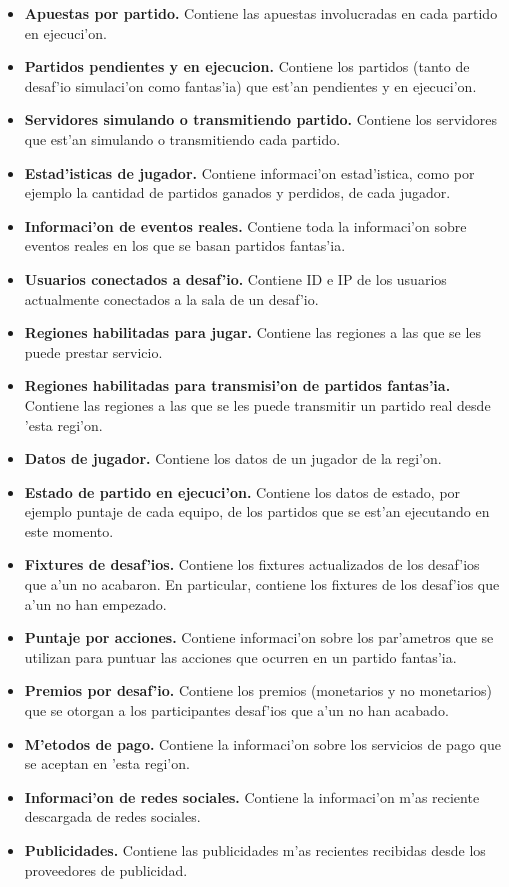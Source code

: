 \begin{itemize}
	\item \textbf{Apuestas por partido.} Contiene las apuestas involucradas en cada partido en ejecuci'on.
	\item \textbf{Partidos pendientes y en ejecucion.} Contiene los partidos (tanto de desaf'io simulaci'on como fantas'ia) que est'an pendientes y en ejecuci'on.
	\item \textbf{Servidores simulando o transmitiendo partido.} Contiene los servidores que est'an simulando o transmitiendo cada partido.
	\item \textbf{Estad'isticas de jugador.} Contiene informaci'on estad'istica, como por ejemplo la cantidad de partidos ganados y perdidos, de cada jugador.
	\item \textbf{Informaci'on de eventos reales.} Contiene toda la informaci'on sobre eventos reales en los que se basan partidos fantas'ia.
	\item \textbf{Usuarios conectados a desaf'io.} Contiene ID e IP de los usuarios actualmente conectados a la sala de un desaf'io.
	\item \textbf{Regiones habilitadas para jugar.} Contiene las regiones a las que se les puede prestar servicio.
	\item \textbf{Regiones habilitadas para transmisi'on de partidos fantas'ia.} Contiene las regiones a las que se les puede transmitir un partido real desde 'esta regi'on.
	\item \textbf{Datos de jugador.} Contiene los datos de un jugador de la regi'on.
	\item \textbf{Estado de partido en ejecuci'on.} Contiene los datos de estado, por ejemplo puntaje de cada equipo, de los partidos que se est'an ejecutando en este momento.
	\item \textbf{Fixtures de desaf'ios.} Contiene los fixtures actualizados de los desaf'ios que a'un no acabaron. En particular, contiene los fixtures de los desaf'ios que a'un no han empezado.
	\item \textbf{Puntaje por acciones.} Contiene informaci'on sobre los par'ametros que se utilizan para puntuar las acciones que ocurren en un partido fantas'ia.
	\item \textbf{Premios por desaf'io.} Contiene los premios (monetarios y no monetarios) que se otorgan a los participantes desaf'ios que a'un no han acabado.
	\item \textbf{M'etodos de pago.} Contiene la informaci'on sobre los servicios de pago que se aceptan en 'esta regi'on.
	\item \textbf{Informaci'on de redes sociales.} Contiene la informaci'on m'as reciente descargada de redes sociales.
	\item \textbf{Publicidades.} Contiene las publicidades m'as recientes recibidas desde los proveedores de publicidad.
\end{itemize}

